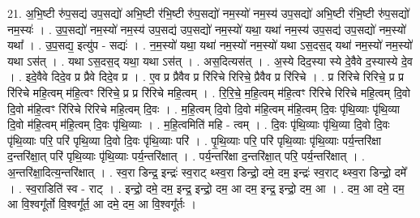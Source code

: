\documentclass[17pt]{extarticle}
\begin{document}
21. अ॒भि॒ष्टी रु॑प॒सद्य॑ उप॒सद्यो॑ अभि॒ष्टी र॑भि॒ष्टी रु॑प॒सद्यो॑ नम॒स्यो॑ नम॒स्य॑ उप॒सद्यो॑ अभि॒ष्टी र॑भि॒ष्टी रु॑प॒सद्यो॑ नम॒स्यः॑ । . उ॒प॒सद्यो॑ नम॒स्यो॑ नम॒स्य॑ उप॒सद्य॑ उप॒सद्यो॑ नम॒स्यो॑ यथा॒ यथा॑ नम॒स्य॑ उप॒सद्य॑ उप॒सद्यो॑ नम॒स्यो॑ यथा᳚ । . उ॒प॒सद्य॒ इत्यु॑प - सद्यः॑ । . न॒म॒स्यो॑ यथा॒ यथा॑ नम॒स्यो॑ नम॒स्यो॑ यथा ऽस॒दस॒द् यथा॑ नम॒स्यो॑ नम॒स्यो॑ यथा ऽस॑त् । . यथा ऽस॒दस॒द् यथा॒ यथा ऽस॑त् । . अस॒दित्यस॑त् । . अ॒स्ये दिद॒स्या स्ये दे॒वैवे द॒स्यास्ये दे॒व । . इदे॒वैवे दिदे॒व प्र प्रैवे दिदे॒व प्र । . ए॒व प्र प्रैवैव प्र रि॑रिचे रिरिचे॒ प्रैवैव प्र रि॑रिचे । . प्र रि॑रिचे रिरिचे॒ प्र प्र रि॑रिचे महि॒त्वम् म॑हि॒त्वꣳ रि॑रिचे॒ प्र प्र रि॑रिचे महि॒त्वम् । . रि॒रि॒चे॒ म॒हि॒त्वम् म॑हि॒त्वꣳ रि॑रिचे रिरिचे महि॒त्वम् दि॒वो दि॒वो म॑हि॒त्वꣳ रि॑रिचे रिरिचे महि॒त्वम् दि॒वः । . म॒हि॒त्वम् दि॒वो दि॒वो म॑हि॒त्वम् म॑हि॒त्वम् दि॒वः पृ॑थि॒व्याः पृ॑थि॒व्या दि॒वो म॑हि॒त्वम् म॑हि॒त्वम् दि॒वः पृ॑थि॒व्याः । . म॒हि॒त्वमिति॑ महि - त्वम् । . दि॒वः पृ॑थि॒व्याः पृ॑थि॒व्या दि॒वो दि॒वः पृ॑थि॒व्याः परि॒ परि॑ पृथि॒व्या दि॒वो दि॒वः पृ॑थि॒व्याः परि॑ । . पृ॒थि॒व्याः परि॒ परि॑ पृथि॒व्याः पृ॑थि॒व्याः पर्य॒न्तरि॑क्षा द॒न्तरि॑क्षा॒त् परि॑ पृथि॒व्याः पृ॑थि॒व्याः पर्य॒न्तरि॑क्षात् । . पर्य॒न्तरि॑क्षा द॒न्तरि॑क्षा॒त् परि॒ पर्य॒न्तरि॑क्षात् । . अ॒न्तरि॑क्षा॒दित्य॒न्तरि॑क्षात् । . स्व॒रा डिन्द्र॒ इन्द्रः॑ स्व॒राट् थ्स्व॒रा डिन्द्रो॒ दमे॒ दम॒ इन्द्रः॑ स्व॒राट् थ्स्व॒रा डिन्द्रो॒ दमे᳚ । . स्व॒राडिति॑ स्व - राट् । . इन्द्रो॒ दमे॒ दम॒ इन्द्र॒ इन्द्रो॒ दम॒ आ दम॒ इन्द्र॒ इन्द्रो॒ दम॒ आ । . दम॒ आ दमे॒ दम॒ आ वि॒श्वगू᳚र्तो वि॒श्वगू᳚र्त॒ आ दमे॒ दम॒ आ वि॒श्वगू᳚र्तः । \newline
\end{document}
